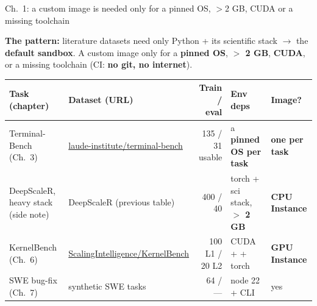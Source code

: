 \begin{frame}{Ch.\ 1: a custom image is needed only for a pinned OS, $>$2 GB, CUDA or a missing toolchain}
{\footnotesize\textbf{The pattern:} literature datasets need only Python + its scientific stack $\rightarrow$ the \textbf{default sandbox}. A custom image only for a \textbf{pinned OS}, \textbf{$>$ 2 GB}, \textbf{CUDA}, or a missing toolchain (CI: \textbf{no git, no internet}).\par}
\vspace{2mm}
\footnotesize\setlength{\tabcolsep}{4pt}
\begin{tabularx}{\textwidth}{@{}>{\raggedright\arraybackslash}p{2.9cm} Y r >{\raggedright\arraybackslash}p{2.6cm} l@{}}
\toprule
\textbf{Task (chapter)} & \textbf{Dataset (URL)} & \textbf{Train / eval} & \textbf{Env deps} & \textbf{Image?}\\
\midrule
Terminal-Bench (Ch.\ 3) & \href{https://github.com/laude-institute/terminal-bench}{\textcolor{linkc}{laude-institute/terminal-bench}} & 135 / 31 usable & a \textbf{pinned OS per task} & \textbf{one per task}\\
DeepScaleR, heavy stack (side note) & DeepScaleR (previous table) & 400 / 40 & torch + sci stack, \textbf{$>$ 2 GB} & \textbf{CPU Instance}\\
KernelBench (Ch.\ 6) & \href{https://github.com/ScalingIntelligence/KernelBench}{\textcolor{linkc}{ScalingIntelligence/KernelBench}} & 100 L1 / 20 L2 & CUDA +  + torch & \textbf{GPU Instance}\\
SWE bug-fix (Ch.\ 7) & synthetic SWE tasks & 64 / --- & node 22 +  CLI & yes\\
\bottomrule
\end{tabularx}
\end{frame}

